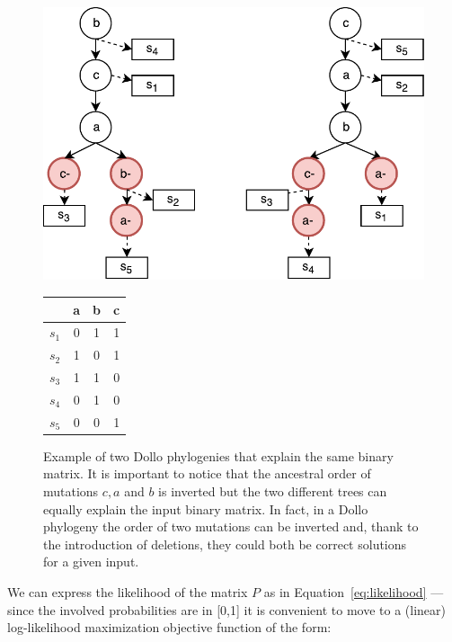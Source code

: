 \documentclass[a4paper,USenglish]{article}
\theoremstyle{definition}
\begin{document}
\begin{figure}[!tb]
  \begin{minipage}{0.72\linewidth}
    \includegraphics[scale=.65]{img/dollo_non_unique}
  \end{minipage}
  \begin{minipage}{0.2\linewidth}
    \begin{tabular}[!t]{c|ccc}
      & a & b & c \\ \hline
      $s_1$ & 0 & 1 & 1 \\
      $s_2$ & 1 & 0 & 1 \\
      $s_3$ & 1 & 1 & 0 \\
      $s_4$ & 0 & 1 & 0 \\
      $s_5$ & 0 & 0 & 1
    \end{tabular}
  \end{minipage}
  \caption{Example of two Dollo phylogenies that explain the same
    binary matrix.  It is important to notice that the ancestral order
    of mutations $c,a$ and $b$ is inverted but the two different trees
    can equally explain the input binary matrix. In fact, in a Dollo
    phylogeny the order of two mutations can be inverted and, thank to
    the introduction of deletions, they could both be correct
    solutions for a given input.  }
  \label{fig:dollo_non_unique}
\end{figure}

We can express the likelihood of the matrix $P$ as in
Equation~\ref{eq:likelihood} --- since the involved probabilities are
in [0,1] it is convenient to move to a (linear) log-likelihood
maximization objective function of the form:
\end{document}

